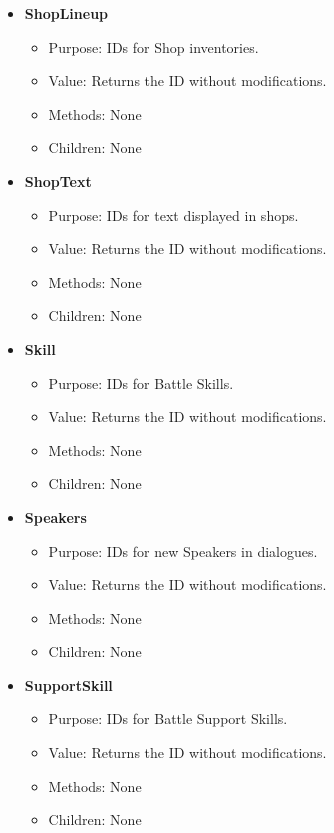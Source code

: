 \documentclass{article}
\begin{document}
\begin{itemize}
	\item \textbf{ShopLineup}
	\begin{itemize}
		\item Purpose: IDs for Shop inventories.
		\item Value: Returns the ID without modifications.
		\item Methods: None
		\item Children: None
	\end{itemize}
	
	\item \textbf{ShopText}
	\begin{itemize}
		\item Purpose: IDs for text displayed in shops.
		\item Value: Returns the ID without modifications.
		\item Methods: None
		\item Children: None
	\end{itemize}
	
	\item \textbf{Skill}
	\begin{itemize}
		\item Purpose: IDs for Battle Skills.
		\item Value: Returns the ID without modifications.
		\item Methods: None
		\item Children: None
	\end{itemize}
	
	\item \textbf{Speakers}
	\begin{itemize}
		\item Purpose: IDs for new Speakers in dialogues.
		\item Value: Returns the ID without modifications.
		\item Methods: None
		\item Children: None
	\end{itemize}
	
	\item \textbf{SupportSkill}
	\begin{itemize}
		\item Purpose: IDs for Battle Support Skills.
		\item Value: Returns the ID without modifications.
		\item Methods: None
		\item Children: None
	\end{itemize}
	

\end{itemize}
\end{document}
